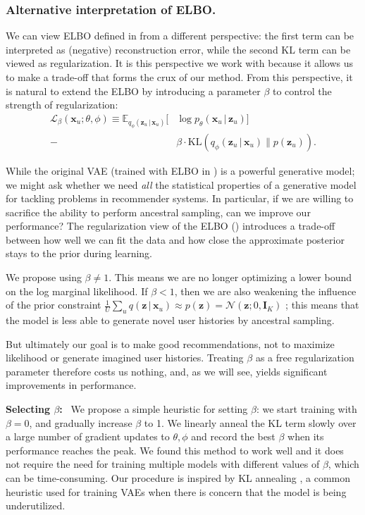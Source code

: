 \documentclass[sigconf]{acmart}
\newcommand{\mathbold}[1]{\ensuremath{\boldsymbol{\mathbf{#1}}}}
\DeclareRobustCommand{\parhead}[1]{\textbf{#1}~}
\newcommand{\mbx}{\mathbold{x}}
\newcommand{\mbz}{\mathbold{z}}
\newcommand{\mbI}{\mathbold{I}}
\newcommand{\g}{\,\vert\,}
\newcommand{\cL}{\mathcal{L}}
\begin{document}
\subsubsection{Alternative interpretation of \gls{ELBO}.} \label{sec:reg}
We can view \gls{ELBO} defined in  from a different perspective: the first term can be interpreted as (negative) reconstruction error, while 
the second KL term can be viewed as regularization. It is this perspective we work with because it allows us to make a trade-off that forms the crux of our method.  
From this perspective, it is natural to extend the \gls{ELBO} by introducing a parameter $\beta$ to control the strength of regularization:
\begin{equation} \label{eq:elbo_anneal}
\begin{split}
\cL_\beta(\mbx_u; \theta, \phi) \equiv \mathbb{E}_{q_\phi(\mbz_u \g \mbx_u)}[&\log p_\theta(\mbx_u \g \mbz_u)] \\
-& \beta\cdot \mathrm{KL}(q_\phi(\mbz_u \g \mbx_u) \| p(\mbz_u)).
\end{split}
\end{equation}

While the original \gls{VAE} (trained with \gls{ELBO} in ) is a powerful generative model;
we might ask whether
we need \emph{all} the statistical properties of a generative model for tackling problems in recommender systems. 
In particular, if we are willing to sacrifice the ability to perform ancestral sampling, can we improve our performance?
The regularization view of the \gls{ELBO} () introduces a trade-off between how well we can fit the data and 
how close the approximate posterior stays to the prior during learning.

We propose using $\beta \neq 1$. This means we are no longer optimizing a lower bound on the log marginal likelihood.
If $\beta < 1$, then we are also weakening the influence of the prior constraint
$\frac{1}{U}\sum_u q(\mbz \g \mbx_u)\approx p(\mbz) = \mathcal{N}(\mbz; 0, \mbI_K)$
\citep{hoffman2016elbo}; this means that the model is less able to generate novel user histories by ancestral sampling.

But ultimately our goal is to make good recommendations, not to maximize likelihood or generate imagined user histories.
Treating $\beta$ as a free regularization parameter therefore costs us nothing, and, as we will see, yields significant improvements in performance.

\parhead{Selecting $\beta$:} 
We propose a simple heuristic for setting $\beta$: we start
training with $\beta = 0$, and gradually increase $\beta$ to 1. 
We linearly anneal the KL term slowly over a large number of gradient updates to $\theta,\phi$ and record the best $\beta$ when its performance reaches the peak.
We found this method to work well and it does not require the need for training multiple models with different values of $\beta$, which can be time-consuming. 
Our procedure is inspired by KL annealing \citep{bowman2015generating}, a common heuristic used for training \glspl{VAE} when there is concern that the model is being underutilized. 
\end{document}

